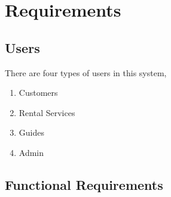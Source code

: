 \section{Requirements}
\subsection{Users}
There are four types of users in this system,
\begin{enumerate}
\itemsep0em 
	\item Customers
	\item Rental Services
	\item Guides
	\item Admin
\end{enumerate}
\subsection{Functional Requirements}






\clearpage